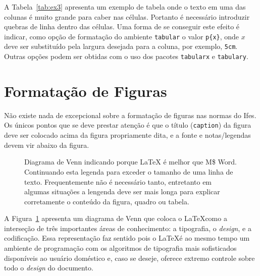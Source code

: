 \documentclass[times,english,brazilian,oneside,section=TITLE]{ifes8}
\begin{document}
A Tabela~\ref{tab:ex3} apresenta um exemplo de tabela onde o texto em
uma das colunas é muito grande para caber nas células. Portanto é
necessário introduzir quebras de linha dentro das células. Uma forma
de se conseguir este efeito é indicar, como opção de formatação do
ambiente \texttt{tabular} o valor \verb!p{x}!, onde $x$ deve ser
substituído pela largura desejada para a coluna, por exemplo,
\texttt{5cm}. Outras opções podem ser obtidas com o uso dos pacotes
\texttt{tabularx} e \texttt{tabulary}.



\section{Formatação de Figuras}
\label{sec:format-figuras}

Não existe nada de excepcional sobre a formatação de figuras nas
normas do Ifes. Os únicos pontos que se deve prestar atenção é que o
título (\texttt{caption}) da figura deve ser colocado acima da figura
propriamente dita, e a fonte e notas/legendas devem vir abaixo da
figura.

\begin{figure}[h]
  \centering
  \caption{Diagrama de Venn indicando porque \LaTeX{} é melhor que M\$ Word.
    Continuando esta legenda para exceder o tamanho de uma linha de texto.
    Frequentemente não é necessário tanto, entretanto em algumas situações a
    lengenda deve ser mais longa para explicar corretamente o conteúdo da
    figura, quadro ou tabela.}
  \label{fig:ex1}
\end{figure}

A Figura~\ref{fig:ex1} apresenta um diagrama de Venn que coloca o
\LaTeX como a interseção de três importantes áreas de conhecimento: a
tipografia, o \emph{design}, e a codificação. Essa representação faz
sentido pois o \LaTeX é ao mesmo tempo um ambiente de programação com
os algoritmos de tipografia mais sofisticados disponíveis ao usuário
doméstico e, caso se deseje, oferece extremo controle sobre todo o
\emph{design} do documento.
\end{document}
